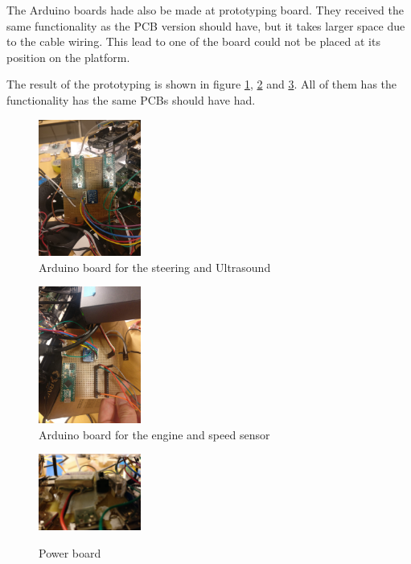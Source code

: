 \documentclass[11pt, titlepage]{article} %
\begin{document}
The Arduino boards hade also be made at prototyping board. They received the same functionality as the PCB version should have, but it takes larger space due to the cable wiring. This lead to one of the board could not be placed at its position on the platform. 

The result of the prototyping is shown in figure \ref{fig:board_ultra_steering}, \ref{fig:board_speed_engine} and \ref{fig:Power_board}. All of them has the functionality has the same PCBs should have had. 


\begin{figure}
	\includegraphics[width=0.3\textwidth]{arduino1.jpg}
	\caption{Arduino board for the steering and Ultrasound}
	\label{fig:board_ultra_steering}
\end{figure}

\begin{figure}
	\includegraphics[width=0.3\textwidth]{arduino2.jpg}
	\caption{Arduino board for the engine and speed sensor}
	\label{fig:board_speed_engine}
\end{figure}

\begin{figure}
	\includegraphics[width=0.3\textwidth]{power_board.jpg}
	\label{fig:Power_board}
	\caption{Power board}
\end{figure}
\end{document}
